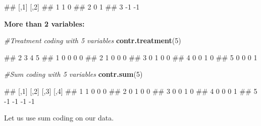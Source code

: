 \documentclass[
]{book}
\newenvironment{Shaded}{\begin{snugshade}}{\end{snugshade}}
\newcommand{\AttributeTok}[1]{\textcolor[rgb]{0.13,0.29,0.53}{#1}}
\newcommand{\CommentTok}[1]{\textcolor[rgb]{0.56,0.35,0.01}{\textit{#1}}}
\newcommand{\DecValTok}[1]{\textcolor[rgb]{0.00,0.00,0.81}{#1}}
\newcommand{\FunctionTok}[1]{\textcolor[rgb]{0.13,0.29,0.53}{\textbf{#1}}}
\newcommand{\NormalTok}[1]{#1}
\newcommand{\OtherTok}[1]{\textcolor[rgb]{0.56,0.35,0.01}{#1}}
\newcommand{\SpecialCharTok}[1]{\textcolor[rgb]{0.81,0.36,0.00}{\textbf{#1}}}
\begin{document}
\begin{Shaded}
\begin{Highlighting}[]
\NormalTok{\#\#   [,1] [,2]}
\NormalTok{\#\# 1    1    0}
\NormalTok{\#\# 2    0    1}
\NormalTok{\#\# 3   {-}1   {-}1}
\end{Highlighting}
\end{Shaded}

\textbf{More than 2 variables:}

\begin{Shaded}
\begin{Highlighting}[]
\CommentTok{\#Treatment coding with 5 variables}
\FunctionTok{contr.treatment}\NormalTok{(}\DecValTok{5}\NormalTok{)}
\end{Highlighting}
\end{Shaded}

\begin{Shaded}
\begin{Highlighting}[]
\NormalTok{\#\#   2 3 4 5}
\NormalTok{\#\# 1 0 0 0 0}
\NormalTok{\#\# 2 1 0 0 0}
\NormalTok{\#\# 3 0 1 0 0}
\NormalTok{\#\# 4 0 0 1 0}
\NormalTok{\#\# 5 0 0 0 1}
\end{Highlighting}
\end{Shaded}

\begin{Shaded}
\begin{Highlighting}[]
\CommentTok{\#Sum coding with 5 variables}
\FunctionTok{contr.sum}\NormalTok{(}\DecValTok{5}\NormalTok{)}
\end{Highlighting}
\end{Shaded}

\begin{Shaded}
\begin{Highlighting}[]
\NormalTok{\#\#   [,1] [,2] [,3] [,4]}
\NormalTok{\#\# 1    1    0    0    0}
\NormalTok{\#\# 2    0    1    0    0}
\NormalTok{\#\# 3    0    0    1    0}
\NormalTok{\#\# 4    0    0    0    1}
\NormalTok{\#\# 5   {-}1   {-}1   {-}1   {-}1}
\end{Highlighting}
\end{Shaded}

Let us use sum coding on our data.

\begin{Shaded}
\end{Shaded}
\end{document}
